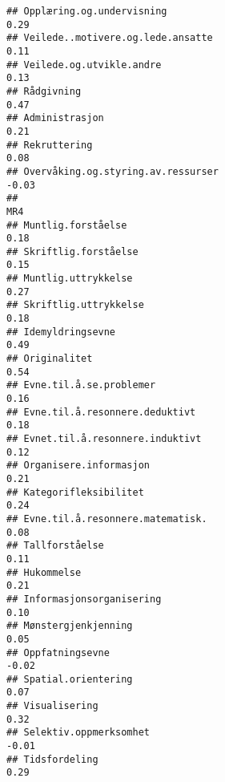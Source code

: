 \documentclass[
]{article}
\begin{document}
\begin{verbatim}
## Opplæring.og.undervisning                                                         0.29
## Veilede..motivere.og.lede.ansatte                                                 0.11
## Veilede.og.utvikle.andre                                                          0.13
## Rådgivning                                                                        0.47
## Administrasjon                                                                    0.21
## Rekruttering                                                                      0.08
## Overvåking.og.styring.av.ressurser                                               -0.03
##                                                                                    MR4
## Muntlig.forståelse                                                                0.18
## Skriftlig.forståelse                                                              0.15
## Muntlig.uttrykkelse                                                               0.27
## Skriftlig.uttrykkelse                                                             0.18
## Idemyldringsevne                                                                  0.49
## Originalitet                                                                      0.54
## Evne.til.å.se.problemer                                                           0.16
## Evne.til.å.resonnere.deduktivt                                                    0.18
## Evnet.til.å.resonnere.induktivt                                                   0.12
## Organisere.informasjon                                                            0.21
## Kategorifleksibilitet                                                             0.24
## Evne.til.å.resonnere.matematisk.                                                  0.08
## Tallforståelse                                                                    0.11
## Hukommelse                                                                        0.21
## Informasjonsorganisering                                                          0.10
## Mønstergjenkjenning                                                               0.05
## Oppfatningsevne                                                                  -0.02
## Spatial.orientering                                                               0.07
## Visualisering                                                                     0.32
## Selektiv.oppmerksomhet                                                           -0.01
## Tidsfordeling                                                                     0.29

\end{verbatim}
\end{document}
